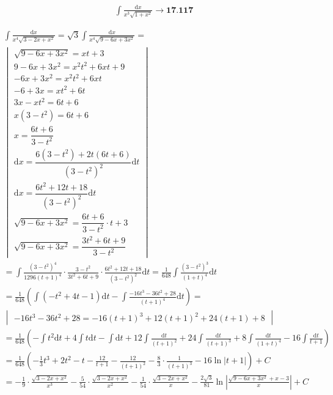 
\begin{gather*} \int{\frac{\mbox{d}x}{x^3\sqrt{1+x^2}}} \to \textbf{17.117}\end{gather*}


\begin{gather*}
\int{\frac{\mbox{d}x}{x^4\sqrt{3-2x+x^2}}}=\sqrt{3}\int{\frac{\mbox{d}x}{x^4\sqrt{9-6x+3x^2}}} = \\
\begin{vmatrix}
  \sqrt{9-6x+3x^2}=xt+3\\
  9-6x+3x^2=x^2t^2+6xt+9\\
  -6x+3x^2=x^2t^2+6xt\\
  -6+3x=xt^2+6t\\
  3x-xt^2=6t+6\\
  x(3-t^2)=6t+6\\
  x=\dfrac{6t+6}{3-t^2}\\
  \mbox{d}x=\dfrac{6(3-t^2)+2t(6t+6)}{(3-t^2)^2}\mbox{d}t\\
  \mbox{d}x=\dfrac{6t^2+12t+18}{(3-t^2)^2}\mbox{d}t\\
  \sqrt{9-6x+3x^2}=\dfrac{6t+6}{3-t^2} \cdot t+3 \\
  \sqrt{9-6x+3x^2}=\dfrac{3t^2+6t+9}{3-t^2}
\end{vmatrix} \\
= \int{\frac{(3-t^2)^4}{1296(t+1)^4}\cdot\frac{3-t^2}{3t^2+6t+9}\cdot\frac{6t^2+12t+18}{(3-t^2)^2}\mbox{d}t}
= \frac{1}{648}\int{\frac{(3-t^2)^3}{(1+t)^4}\mbox{d}t} \\
= \frac{1}{648}\left(\int{(-t^2+4t-1)\mbox{d}t}-\int{\frac{-16t^3-36t^2+28}{(t+1)^4}\mbox{d}t}\right) = \\
\begin{vmatrix} -16t^3-36t^2+28=-16(t+1)^3+12(t+1)^2+24(t+1)+8 \end{vmatrix} \\
= \frac{1}{648}\left(-\int{t^2\mbox{d}t}+4\int{t\mbox{d}t}-\int{\mbox{d}t}+12\int{\frac{\mbox{d}t}{(t+1)^2}}+24\int{\frac{\mbox{d}t}{(t+1)^3}}+8\int{\frac{\mbox{d}t}{(1+t)^4}}-16\int{\frac{\mbox{d}t}{t+1}}\right)\\
= \frac{1}{648}\left(-\frac{1}{3}t^3+2t^2-t-\frac{12}{t+1}-\frac{12}{(t+1)^2}-\frac{8}{3}\cdot\frac{1}{(t+1)^3}-16\ln{\left|t+1\right|}\right)+C\\
= -\frac{1}{9} \cdot \frac{\sqrt{3-2x+x^2}}{x^3}-\frac{5}{54} \cdot \frac{\sqrt{3-2x+x^2}}{x^2}-\frac{1}{54} \cdot \frac{\sqrt{3-2x+x^2}}{x}-\frac{2\sqrt{3}}{81}\ln{\left|\frac{\sqrt{9-6x+3x^2}+x-3}{x}\right|}+C
\end{gather*}

